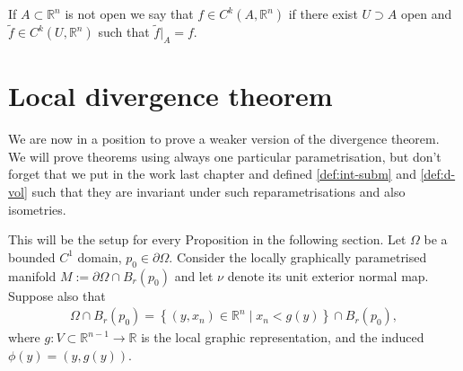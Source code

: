 \begin{remark}
	If $A \subset \mathbb{R}^n$ is not open we say that $f \in C^k\left(A, \mathbb{R}^n\right)$ if there exist $U \supset A$ open and $\widetilde{f} \in C^k\left(U, \mathbb{R}^n\right)$ such that $\widetilde{f}|_{A}=f$.
\end{remark}

\newpage

\section{Local divergence theorem}

We are now in a position to prove a weaker version of the divergence theorem. We will prove theorems using always one particular parametrisation, but don't forget that we put in the work last chapter and defined \ref{def:int-subm} and \ref{def:d-vol} such that they are invariant under such reparametrisations and also isometries.

This will be the setup for every Proposition in the following section. Let $\Omega$ be a bounded $C^{1}$ domain, $p_{0} \in \partial \Omega$. Consider the locally graphically parametrised manifold $M := \partial \Omega \cap B_{r}(p_{0})$ and let $\nu$ denote its unit exterior normal map. Suppose also that
\begin{align*}
	\Omega \cap B_{r}(p_{0}) = \left\{ (y, x_{n}) \in \mathbb{R}^{n} \mid x_{n} < g(y) \right\} \cap B_{r}(p_{0}),
\end{align*}
where $g: V \subset \mathbb{R}^{n-1} \to \mathbb{R}$ is the local graphic representation, and the induced $\phi(y) = (y, g(y))$.

